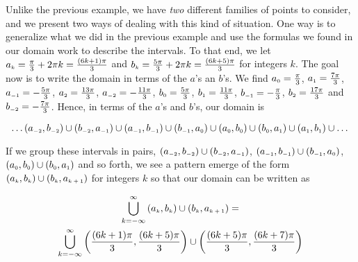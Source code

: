 {\begin{enumerate}
\begin{center}
\end{center}

\drawexampleline

Unlike the previous example, we have \textit{two} different families of points to consider, and we present two ways of dealing with this kind of situation.  One way is to generalize what we did in the previous example and use the formulas we found in our domain work to describe the intervals.  To that end, we let  $a_{\mbox{\tiny $k$}} = \frac{\pi}{3} + 2\pi k = \frac{(6k+1)\pi}{3}$ and  $b_{\mbox{\tiny $k$}} = \frac{5\pi}{3} + 2\pi k = \frac{(6k+5) \pi}{3}$ for integers $k$.  The goal now is to write the domain in terms of the $a$'s an $b$'s.  We find $a_{\mbox{\tiny $0$}} =  \frac{\pi}{3}$, $a_{\mbox{\tiny $1$}} =  \frac{7\pi}{3}$,  $a_{\mbox{\tiny $-1$}} =  -\frac{5\pi}{3}$, $a_{\mbox{\tiny $2$}} =  \frac{13\pi}{3}$, $a_{\mbox{\tiny $-2$}} =  -\frac{11\pi}{3}$, $b_{\mbox{\tiny $0$}} =  \frac{5\pi}{3}$,  $b_{\mbox{\tiny $1$}} =  \frac{11\pi}{3}$, $b_{\mbox{\tiny $-1$}} =  -\frac{\pi}{3}$,  $b_{\mbox{\tiny $2$}} =  \frac{17\pi}{3}$  and $b_{\mbox{\tiny $-2$}} =  -\frac{7\pi}{3}$.  Hence, in terms of the $a$'s and $b$'s, our domain is

\[\ldots  \left(a_{\mbox{\tiny $-2$}}, b_{\mbox{\tiny $-2$}}  \right) \cup \left(b_{\mbox{\tiny $-2$}}, a_{\mbox{\tiny $-1$}}  \right)\cup \left(a_{\mbox{\tiny $-1$}}, b_{\mbox{\tiny $-1$}}  \right)\cup \left(b_{\mbox{\tiny $-1$}}, a_{\mbox{\tiny $0$}}  \right)\cup \left(a_{\mbox{\tiny $0$}}, b_{\mbox{\tiny $0$}}  \right)\cup \left(b_{\mbox{\tiny $0$}}, a_{\mbox{\tiny $1$}}  \right)\cup \left(a_{\mbox{\tiny $1$}}, b_{\mbox{\tiny $1$}}  \right)\cup \dots \]

If we group these intervals in pairs, $ \left(a_{\mbox{\tiny $-2$}}, b_{\mbox{\tiny $-2$}}  \right) \cup \left(b_{\mbox{\tiny $-2$}}, a_{\mbox{\tiny $-1$}}  \right)$, $\left(a_{\mbox{\tiny $-1$}}, b_{\mbox{\tiny $-1$}}  \right)\cup \left(b_{\mbox{\tiny $-1$}}, a_{\mbox{\tiny $0$}}  \right)$, $\left(a_{\mbox{\tiny $0$}}, b_{\mbox{\tiny $0$}}  \right)\cup \left(b_{\mbox{\tiny $0$}}, a_{\mbox{\tiny $1$}}  \right)$ and so forth, we see a pattern emerge of the form  $\left(a_{\mbox{\tiny $k$}}, b_{\mbox{\tiny $k$}}  \right)\cup \left(b_{\mbox{\tiny $k$}}, a_{\mbox{\tiny $k+1$}}  \right)$ for integers $k$ so that our domain can be written as 

\begin{multline}
 \bigcup_{k = -\infty}^{\infty} \left(a_{\mbox{\tiny $k$}}, b_{\mbox{\tiny $k$}}  \right)\cup \left(b_{\mbox{\tiny $k$}}, a_{\mbox{\tiny $k+1$}}  \right) = \\ \bigcup_{k = -\infty}^{\infty} \left(\frac{(6k+1)\pi}{3}, \frac{(6k+5) \pi}{3}  \right)\cup \left(\frac{(6k+5) \pi}{3}, \frac{(6k+7)\pi}{3}  \right)
\end{multline}


\end{enumerate}}
